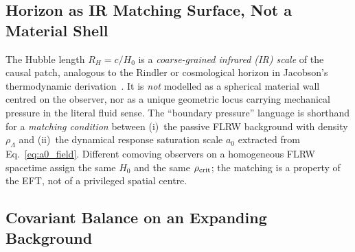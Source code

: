 \documentclass[prd,
               reprint,
               aps,
               preprintnumbers,
               nofootinbib,
               longbibliography,
               floatfix]{revtex4-2}
\begin{document}


\subsection{Horizon as IR Matching Surface, Not a Material Shell}
\label{sec:horizon_reframe}

The Hubble length $R_H=c/H_0$ is a \emph{coarse-grained
infrared (IR) scale} of the causal patch, analogous to
the Rindler or cosmological horizon in Jacobson's
thermodynamic
derivation~\cite{Jacobson1995,Gibbons1977,Bekenstein1973,Hawking1975}.
It is \emph{not} modelled as a spherical material
wall centred on the observer, nor as a unique geometric
locus carrying mechanical pressure in the literal fluid
sense.
The ``boundary pressure'' language is shorthand for a
\emph{matching condition} between (i)~the passive
FLRW background with density $\rho_\Lambda$ and
(ii)~the dynamical response saturation scale $a_0$
extracted from Eq.~\eqref{eq:a0_field}.
Different comoving observers on a homogeneous FLRW
spacetime assign the same $H_0$ and the same
$\rho_{\rm crit}$; the matching is a property of the
EFT, not of a privileged spatial centre.

\subsection{Covariant Balance on an Expanding Background}
\label{sec:covariant_balance}
\end{document}
